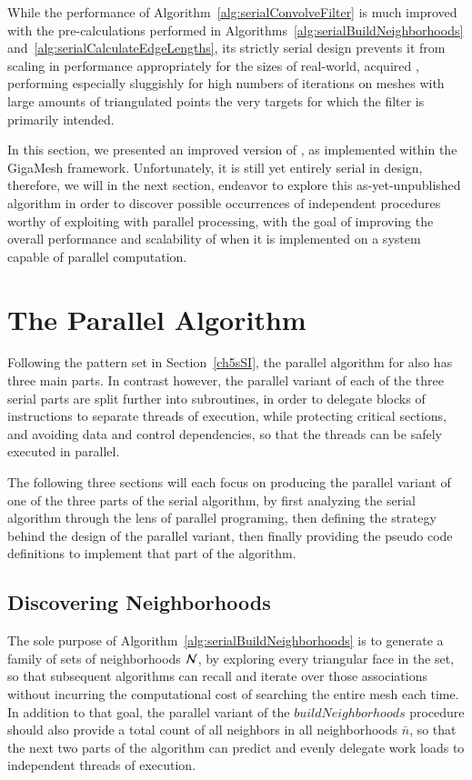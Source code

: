 While the performance of Algorithm~\ref{alg:serialConvolveFilter} is much improved with the pre-calculations performed in Algorithms~\ref{alg:serialBuildNeighborhoods} and~\ref{alg:serialCalculateEdgeLengths}, its strictly serial design prevents it from scaling in performance appropriately for the sizes of real-world, acquired \tdd{}, performing especially sluggishly for high numbers of iterations on meshes with large amounts of triangulated points the very targets for which the filter is primarily intended.

In this section, we presented an improved version of , as implemented within the GigaMesh framework. Unfortunately, it is still yet entirely serial in design, therefore, we will in the next section, endeavor to explore this as-yet-unpublished algorithm in order to discover possible occurrences of independent procedures worthy of exploiting with parallel processing, with the goal of improving the overall performance and scalability of  when it is implemented on a system capable of parallel computation.


%
%
%
%
\section{The Parallel Algorithm}
\label{ch5sPA}
Following the pattern set in Section~\ref{ch5sSI}, the parallel algorithm for  also has three main parts. In contrast however, the parallel variant of each of the three serial parts are split further into subroutines, in order to delegate blocks of instructions to separate threads of execution, while protecting critical sections, and avoiding data and control dependencies, so that the threads can be safely executed in parallel.

The following three sections will each focus on producing the parallel variant of one of the three parts of the serial algorithm, by first analyzing the serial algorithm through the lens of parallel programing, then defining the strategy behind the design of the parallel variant, then finally providing the pseudo code definitions to implement that part of the algorithm.

%
%
\subsection{Discovering Neighborhoods}
\label{ch5sPAssDN}
The sole purpose of Algorithm~\ref{alg:serialBuildNeighborhoods} is to generate a family of sets of neighborhoods $\mathcal{N}$, by exploring every triangular face in the set, so that subsequent algorithms can recall and iterate over those associations without incurring the computational cost of searching the entire mesh each time. In addition to that goal, the parallel variant of the $\mathit{buildNeighborhoods}$ procedure should also provide a total count of all neighbors in all neighborhoods $\bar{n}$, so that the next two parts of the  algorithm can predict and evenly delegate work loads to independent threads of execution.

